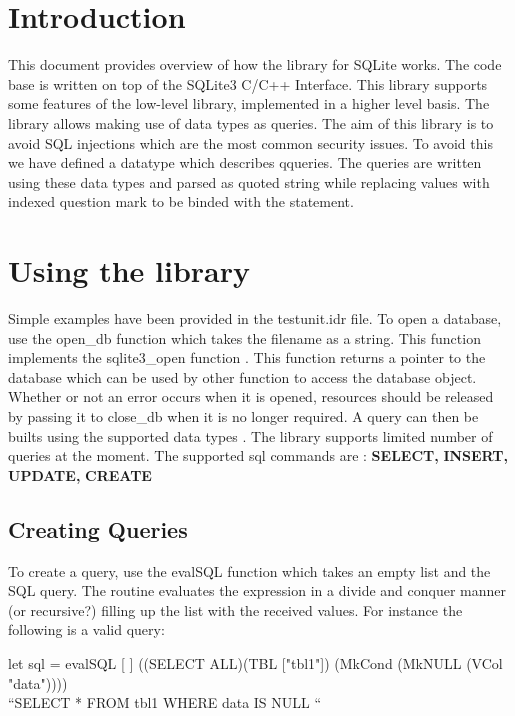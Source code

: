 \documentclass[11pt]{article}
\begin{document}
         
 \section{Introduction}
\label{Introduction} 
This document provides overview of how the library for SQLite works. The code base is written on top of the SQLite3 C/C++ Interface.
This library supports some features of the low-level library, implemented in a higher level basis.
The library allows making use of data types as queries. The aim of this library is to avoid
SQL injections which are the most common security issues.
To avoid this we have defined a datatype which describes qqueries.
The queries are written using these data types and parsed as quoted string
while replacing values with indexed question mark to be binded with the statement.
\section{Using the library}
\label{Using the library}
Simple examples have been provided in the testunit.idr file.
To open a database, use the open\_db function which takes the filename as a string. 
This function implements the sqlite3\_open function .
This function returns a pointer to the database which can be used by other function to access the database object.
Whether or not an error occurs when it is opened,
resources should be released by passing it to close\_db when it is no longer required.
A query can then be builts using the supported data types .
The library supports limited number of queries at the moment. The supported sql commands are :
\newline
\newline
\textbf{SELECT,}
\textbf{INSERT,}
\textbf{UPDATE,}
\textbf{CREATE}

\subsection{Creating Queries}
\label{Creating Queries}

To create a query, use the evalSQL function which takes an empty list and the SQL query.
The routine evaluates the expression in a divide and conquer manner (or recursive?)
filling up the list with the received values. For instance the following is a valid query:

let sql = evalSQL [ ] ((SELECT ALL)(TBL ["tbl1"]) (MkCond (MkNULL (VCol "data"))))
\newline
{}
\\“SELECT * FROM tbl1 WHERE data IS NULL “
\end{document}
